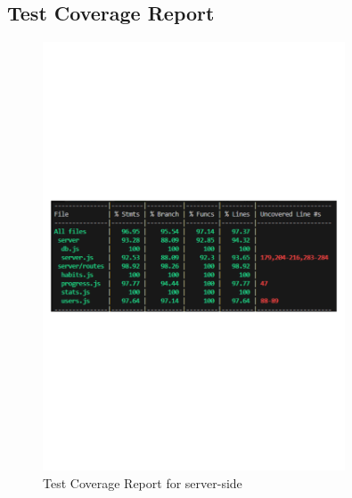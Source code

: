 \subsection{Test Coverage Report} \label{sect:test-coverage} 
\begin{figure}[H]
    \centering
    \includegraphics[width=0.8\textwidth]{resources/test_two.pdf}
    \caption{Test Coverage Report for server-side}
    \label{fig:test_two}
\end{figure}

